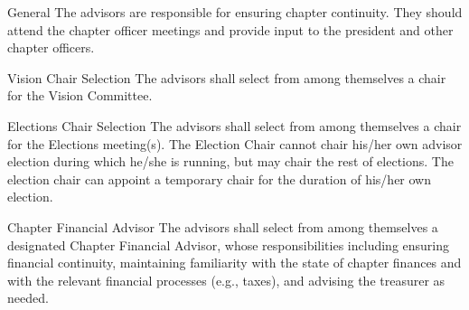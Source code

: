 \begin{enumsubsection}
\item{General} The advisors are responsible for ensuring chapter continuity. They should attend the chapter officer meetings and provide input to the president and other chapter officers.

\item{Vision Chair Selection} The advisors shall select from among themselves a chair for the Vision Committee.\label{sec:visionChair}

\item{Elections Chair Selection} The advisors shall select from among themselves a chair for the Elections meeting(s). The Election Chair cannot chair his/her own advisor election during which he/she is running, but may chair the rest of elections. The election chair can appoint a temporary chair for the duration of his/her own election.

\item{Chapter Financial Advisor} The advisors shall select from among themselves a designated Chapter Financial Advisor, whose responsibilities including ensuring financial continuity, maintaining familiarity with the state of chapter finances and with the relevant financial processes (e.g., taxes), and advising the treasurer as needed.

\end{enumsubsection}
